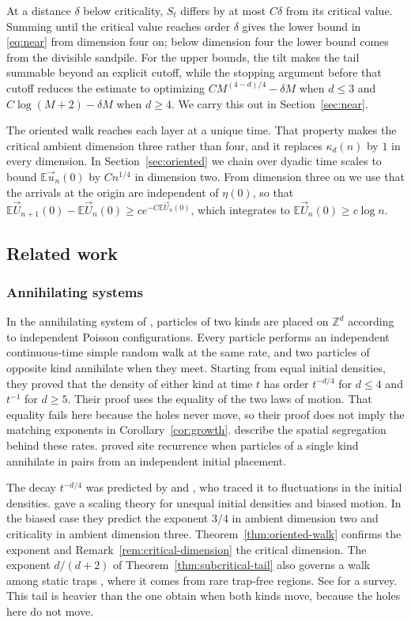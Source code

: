 \documentclass[11pt]{amsart}
\theoremstyle{plain}
\theoremstyle{definition}
\newcommand{\Z}{\mathbb{Z}}
\newcommand{\E}{\mathbb{E}}
\begin{document}
At a distance $\delta$ below criticality, $S_t$ differs by at most $C\delta$
from its critical value. Summing until the critical value reaches order
$\delta$ gives the lower bound in \eqref{eq:near} from dimension four on; below
dimension four the lower bound comes from the divisible sandpile. For the upper bounds, the
tilt makes the tail summable beyond an explicit cutoff, while the stopping
argument before that cutoff reduces the estimate to optimizing
$CM^{(4-d)/4}-\delta M$ when $d\leq3$ and $C\log(M+2)-\delta M$ when $d\geq4$.
We carry this out in Section~\ref{sec:near}.

The oriented walk reaches each layer at a unique time. That property makes the
critical ambient dimension three rather than four, and it replaces
$\kappa_d(n)$ by $1$ in every dimension. In Section~\ref{sec:oriented} we chain over dyadic time
scales to bound $\E\vec u_n(0)$ by $Cn^{1/4}$ in dimension two. From dimension
three on we use that the arrivals at the origin are independent of $\eta(0)$, so
that $\E\vec U_{n+1}(0)-\E\vec U_n(0)\geq ce^{-C\E\vec U_n(0)}$, which
integrates to $\E\vec U_n(0)\geq c\log n$.

\subsection{Related work}\label{ssec:related}

\subsubsection{Annihilating systems}

In the annihilating system of \citet{BL}, particles of two kinds are placed on
$\Z^d$ according to independent Poisson configurations. Every particle
performs an independent continuous-time simple random walk at the same rate,
and two particles of opposite kind annihilate when they meet. Starting from
equal initial densities, they proved that the density of either kind at time
$t$ has order $t^{-d/4}$ for $d\leq4$ and $t^{-1}$ for $d\geq5$. Their proof
uses the equality of the two laws of motion. That equality fails here because
the holes never move, so their proof does not imply the matching exponents in
Corollary~\ref{cor:growth}.
\citet{BL01} describe the spatial segregation behind these rates.
\citet{Arratia} proved site recurrence when particles of a single kind
annihilate in pairs from an independent initial placement.

The decay $t^{-d/4}$ was predicted by \citet{OZ} and \citet{TW}, who traced it
to fluctuations in the initial densities. \citet{KR} gave a scaling theory for
unequal initial densities and biased motion. In the biased case they predict the
exponent $3/4$ in ambient dimension two and criticality in ambient dimension
three. Theorem~\ref{thm:oriented-walk} confirms the exponent and
Remark~\ref{rem:critical-dimension} the critical dimension. The
exponent $d/(d+2)$ of Theorem~\ref{thm:subcritical-tail} also governs a walk
among static traps \citep{BV}, where it comes from rare trap-free regions. See
\citet{ADS} for a survey. This tail is heavier than the one \citet{BL} obtain
when both kinds move, because the holes here do not move.
\end{document}
